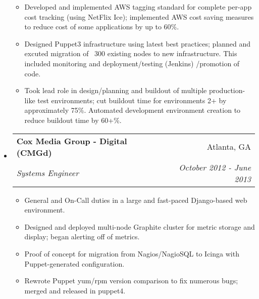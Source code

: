 \documentclass[letterpaper,11pt]{article}
\makeatletter
\newcommand{\resitem}[1]{\item #1 \vspace{-2pt}}
\newcommand{\ressubheading}[4]{
\begin{tabular*}{7.0in}{l@{\extracolsep{\fill}}r}
		\textbf{#1} & #2 \\
		\textit{#3} & \textit{#4} \\
\end{tabular*}\vspace{-6pt}}
\makeatother
\begin{document}
\begin{itemize}
\begin{itemize}
                \resitem{Developed and implemented AWS tagging standard for complete per-app cost tracking (using NetFlix Ice); implemented AWS cost saving measures to reduce cost of some applications by up to 60\%.}
                \resitem{Designed Puppet3 infrastructure using latest best practices; planned and excuted migration of ~300 existing nodes to new infrastructure. This included monitoring and deployment/testing (Jenkins) /promotion of code.}
                \resitem{Took lead role in design/planning and buildout of multiple production-like test environments; cut buildout time for environments 2+ by approximately 75\%. Automated development environment creation to reduce buildout time by 60+\%.}
	\end{itemize}

\item
	\ressubheading{Cox Media Group - Digital (CMGd)}{Atlanta, GA}{Systems Engineer}{October 2012 - June 2013}
	\begin{itemize}
                \resitem{General and On-Call duties in a large and fast-paced Django-based web environment.}
                \resitem{Designed and deployed multi-node Graphite cluster for metric storage and display; began alerting off of metrics.}
                \resitem{Proof of concept for migration from Nagios/NagioSQL to Icinga with Puppet-generated configuration.}
                \resitem{Rewrote Puppet yum/rpm version comparison to fix numerous bugs; merged and released in puppet4.}
	\end{itemize}


\end{itemize}
\end{document}
